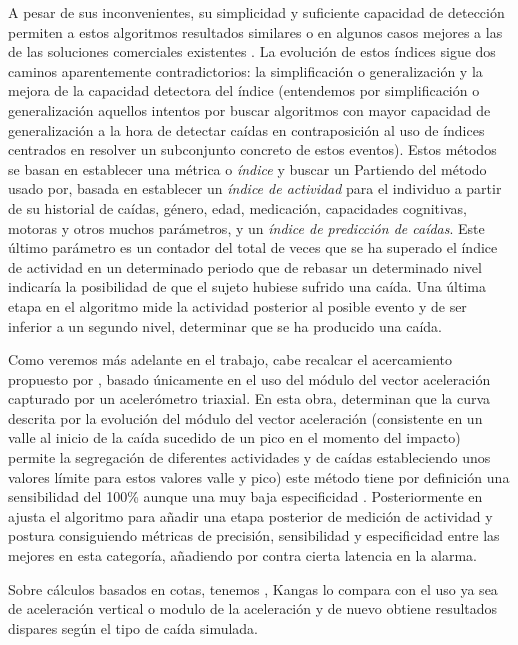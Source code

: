 A pesar de sus inconvenientes, su simplicidad y suficiente capacidad de detección permiten a estos algoritmos resultados similares o en algunos casos mejores a las de las soluciones comerciales existentes \cite{Kangas2008}. La evolución de estos índices sigue dos caminos aparentemente contradictorios: la simplificación o generalización y la mejora de la capacidad detectora del índice (entendemos por simplificación o generalización aquellos intentos por buscar algoritmos con mayor capacidad de generalización a la hora de detectar caídas en contraposición al uso de índices centrados en resolver un subconjunto concreto de estos eventos). Estos métodos se basan en establecer una métrica o \textit{índice} y buscar un  Partiendo del método usado por, basada en establecer un \textit{índice de actividad} para el individuo a partir de su historial de caídas, género, edad, medicación, capacidades cognitivas, motoras y otros muchos parámetros, y un \textit{índice de predicción de caídas}. Este último parámetro es un contador del total de veces que se ha superado el índice de actividad en un determinado periodo que de rebasar un determinado nivel indicaría la posibilidad de que el sujeto hubiese sufrido una caída. Una última etapa en el algoritmo mide la actividad posterior al posible evento y de ser inferior a un segundo nivel, determinar que se ha producido una caída. 

Como veremos más adelante en el trabajo, cabe recalcar el acercamiento propuesto por , basado únicamente en el uso del módulo del vector aceleración capturado por un acelerómetro triaxial. En esta obra,  determinan que la curva descrita por la evolución del módulo del vector aceleración (consistente en un valle al inicio de la caída sucedido de un pico en el momento del impacto) permite la segregación de diferentes actividades y de caídas estableciendo unos valores límite para estos valores valle y pico) este método tiene por definición una sensibilidad del 100\% aunque una muy baja especificidad \cite{Aziz2017,Bagala2012}. Posteriormente en  ajusta el algoritmo para añadir una etapa posterior de medición de actividad y postura consiguiendo métricas de precisión, sensibilidad y especificidad entre las mejores en esta categoría, añadiendo por contra cierta latencia en la alarma.

\iffalse

Sobre cálculos basados en cotas, tenemos \cite{fallindex00}, Kangas\cite{Kangas2008} lo compara con el uso ya sea de aceleración vertical o modulo de la aceleración y de nuevo obtiene resultados dispares según el tipo de caída simulada.

